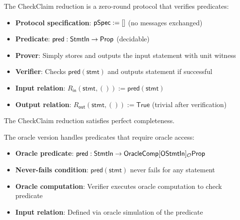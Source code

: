 \begin{definition}
    \label{def:checkclaim_reduction}
    The CheckClaim reduction is a zero-round protocol that verifies predicates:
    \begin{itemize}
        \item \textbf{Protocol specification}: $\mathsf{pSpec} := []$ (no messages exchanged)
        \item \textbf{Predicate}: $\mathsf{pred} : \mathsf{StmtIn} \to \mathsf{Prop}$ (decidable)
        \item \textbf{Prover}: Simply stores and outputs the input statement with unit witness
        \item \textbf{Verifier}: Checks $\mathsf{pred}(\mathsf{stmt})$ and outputs statement if successful
        \item \textbf{Input relation}: $R_{\mathsf{in}}(\mathsf{stmt}, ()) := \mathsf{pred}(\mathsf{stmt})$
        \item \textbf{Output relation}: $R_{\mathsf{out}}(\mathsf{stmt}, ()) := \mathsf{True}$ (trivial after verification)
    \end{itemize}
\end{definition}

\begin{theorem}
    The CheckClaim reduction satisfies perfect completeness.
\end{theorem}

\begin{definition}
    \label{def:checkclaim_oracle_reduction}
    The oracle version handles predicates that require oracle access:
    \begin{itemize}
        \item \textbf{Oracle predicate}: $\mathsf{pred} : \mathsf{StmtIn} \to \mathsf{OracleComp}[\mathsf{OStmtIn}]_{\mathcal{O}} \mathsf{Prop}$
        \item \textbf{Never-fails condition}: $\mathsf{pred}(\mathsf{stmt})$ never fails for any statement
        \item \textbf{Oracle computation}: Verifier executes oracle computation to check predicate
        \item \textbf{Input relation}: Defined via oracle simulation of the predicate
    \end{itemize}
\end{definition}

